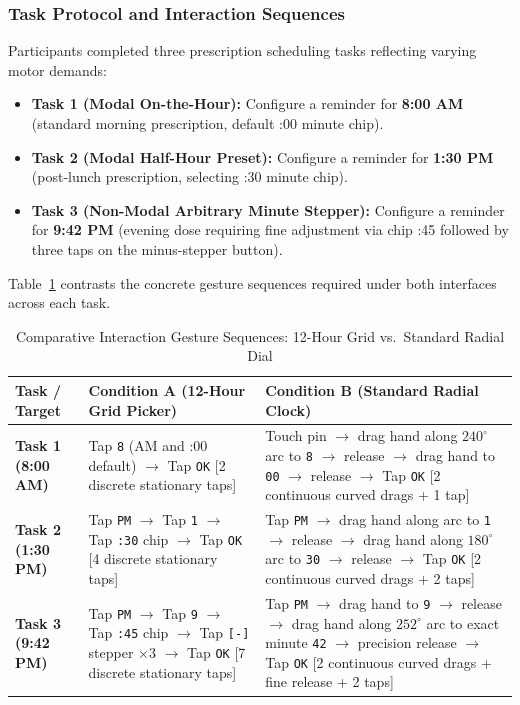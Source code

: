 \documentclass[11pt,a4paper]{article}
\begin{document}
\subsubsection{Task Protocol and Interaction Sequences}
Participants completed three prescription scheduling tasks reflecting varying motor demands:
\begin{itemize}[leftmargin=*]
    \item \textbf{Task 1 (Modal On-the-Hour):} Configure a reminder for \textbf{8:00 AM} (standard morning prescription, default :00 minute chip).
    \item \textbf{Task 2 (Modal Half-Hour Preset):} Configure a reminder for \textbf{1:30 PM} (post-lunch prescription, selecting :30 minute chip).
    \item \textbf{Task 3 (Non-Modal Arbitrary Minute Stepper):} Configure a reminder for \textbf{9:42 PM} (evening dose requiring fine adjustment via chip :45 followed by three taps on the minus-stepper button).
\end{itemize}

Table~\ref{tab:interaction_sequences} contrasts the concrete gesture sequences required under both interfaces across each task.

\begin{table}[htbp]
\centering
\small
\caption{Comparative Interaction Gesture Sequences: 12-Hour Grid vs.\ Standard Radial Dial}
\label{tab:interaction_sequences}
\begin{tabularx}{\linewidth}{lXX}
\toprule
\textbf{Task / Target} & \textbf{Condition A (12-Hour Grid Picker)} & \textbf{Condition B (Standard Radial Clock)} \\
\midrule
\textbf{Task 1 (8:00 AM)} & Tap \texttt{8} (AM and :00 default) $\to$ Tap \texttt{OK} [2 discrete stationary taps] & Touch pin $\to$ drag hand along $240^\circ$ arc to \texttt{8} $\to$ release $\to$ drag hand to \texttt{00} $\to$ release $\to$ Tap \texttt{OK} [2 continuous curved drags + 1 tap] \\
\addlinespace
\textbf{Task 2 (1:30 PM)} & Tap \texttt{PM} $\to$ Tap \texttt{1} $\to$ Tap \texttt{:30} chip $\to$ Tap \texttt{OK} [4 discrete stationary taps] & Tap \texttt{PM} $\to$ drag hand along arc to \texttt{1} $\to$ release $\to$ drag hand along $180^\circ$ arc to \texttt{30} $\to$ release $\to$ Tap \texttt{OK} [2 continuous curved drags + 2 taps] \\
\addlinespace
\textbf{Task 3 (9:42 PM)} & Tap \texttt{PM} $\to$ Tap \texttt{9} $\to$ Tap \texttt{:45} chip $\to$ Tap \texttt{[-]} stepper $\times 3$ $\to$ Tap \texttt{OK} [7 discrete stationary taps] & Tap \texttt{PM} $\to$ drag hand to \texttt{9} $\to$ release $\to$ drag hand along $252^\circ$ arc to exact minute \texttt{42} $\to$ precision release $\to$ Tap \texttt{OK} [2 continuous curved drags + fine release + 2 taps] \\
\bottomrule
\end{tabularx}
\end{table}
\end{document}
